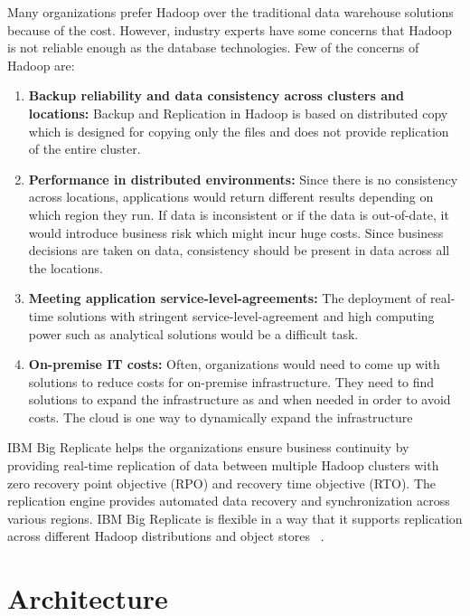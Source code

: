 Many organizations prefer Hadoop over the traditional data warehouse solutions
because of the cost. However, industry experts have some concerns that Hadoop is
not reliable enough as the database technologies. Few of the concerns of Hadoop
are:
\begin{enumerate}[label= (\roman*)]
\item \textbf{Backup reliability and data  consistency across clusters and
locations:} Backup and Replication in Hadoop is based on distributed copy which 
is designed for copying only the files and does not provide replication of the
entire cluster.
\item \textbf{Performance in distributed environments:} Since there is no
consistency across locations, applications would return different results
depending on which region they run. If data is inconsistent or if the data is
out-of-date, it would introduce business risk which might incur huge costs. 
Since business decisions are taken on data, consistency should be present in 
data across all the locations. 
\item \textbf{Meeting application service-level-agreements:} The deployment of
real-time solutions with stringent service-level-agreement and high computing
power such as analytical solutions would be a difficult task. 
\item \textbf{On-premise IT costs:} Often, organizations would need to come up
with solutions to reduce costs for on-premise infrastructure. They need to find
solutions to expand the infrastructure as and when needed in order to avoid 
costs. The cloud is one way to dynamically expand the infrastructure
\end{enumerate}
IBM Big Replicate helps the organizations ensure business continuity by
providing real-time replication of data between multiple Hadoop clusters with 
zero recovery point objective (RPO) and recovery time objective (RTO). The
replication engine provides automated data recovery and synchronization across 
various regions.  IBM Big Replicate is flexible in a way that it supports 
replication across different Hadoop distributions and object stores
~\cite{hid-sp18-408-IBMBigReplicate-intro}.

\section{Architecture}

